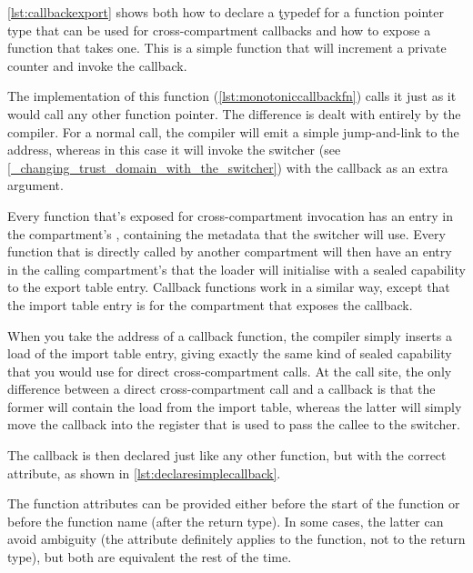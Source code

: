 {{\ref{lst:callbackexport} shows both how to declare a \c{typedef} for a function pointer type that can be used for cross-compartment callbacks and how to expose a function that takes one.
This is a simple function that will increment a private counter and invoke the callback.

\codelisting[filename=examples/compartment_annotation/interface.h,marker=compartment_export_callback,label=lst:callbackexport,caption="Exposing a function that takes a cross-compartment callback for use by other compartments."]{}

The implementation of this function (\ref{lst:monotoniccallbackfn}) calls it just as it would call any other function pointer.
The difference is dealt with entirely by the compiler.
For a normal call, the compiler will emit a simple jump-and-link to the address, whereas in this case it will invoke the switcher (see \ref{_changing_trust_domain_with_the_switcher}) with the callback as an extra argument.

Every function that's exposed for cross-compartment invocation has an entry in the compartment's , containing the metadata that the switcher will use.
Every function that is directly called by another compartment will then have an entry in the calling compartment's  that the loader will initialise with a sealed capability to the export table entry.
Callback functions work in a similar way, except that the import table entry is for the compartment that exposes the callback.

When you take the address of a callback function, the compiler simply inserts a load of the import table entry, giving exactly the same kind of sealed capability that you would use for direct cross-compartment calls.
At the call site, the only difference between a direct cross-compartment call and a callback is that the former will contain the load from the import table, whereas the latter will simply move the callback into the register that is used to pass the callee to the switcher.

\codelisting[filename=examples/compartment_annotation/compartment.cc,marker=monotonic,label=lst:monotoniccallbackfn,caption="The body of a function that invokes a cross-compartment callback."]{}

The callback is then declared just like any other function, but with the correct attribute, as shown in \ref{lst:declaresimplecallback}.

\begin{note}
	The function attributes can be provided either before the start of the function or before the function name (after the return type).
	In some cases, the latter can avoid ambiguity (the attribute definitely applies to the function, not to the return type), but both are equivalent the rest of the time.
\end{note}

}}
